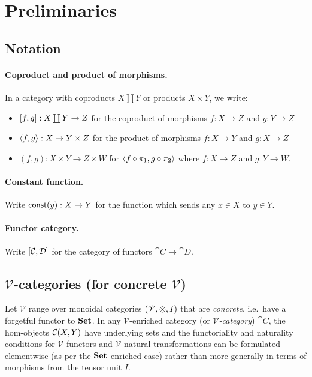 \section{Preliminaries}

\subsection{Notation}

\paragraph{Coproduct and product of morphisms.} In a category with coproducts $X \coprod Y$ or products $X
\times Y$, we write:
\begin{itemize}
\item $[f, g]: X \coprod Y \to Z$ for the coproduct of morphisms $f: X \to Z$ and $g: Y \to Z$
\item $\langle f, g\rangle: X \to Y \times Z$ for the product of morphisms $f: X \to Y$ and $g: X \to Z$
\item $(f,g): X \times Y \to Z \times W$ for $\langle f \circ \pi_1, g \circ \pi_2\rangle$ where $f: X \to Z$ and $g: Y \to W$.
\end{itemize}

\paragraph{Constant function.} Write $\mathsf{const}(y): X \to Y$ for the function which sends any $x \in X$ to $y \in
Y$.

\paragraph{Functor category.} Write $[\mathcal{C},\mathcal{D}]$ for the category of functors $\cat{C} \to
\cat{D}$.

\subsection{$\mathscr{V}$-categories (for concrete $\mathscr{V}$)}

Let $\mathscr{V}$ range over monoidal categories $(\mathscr{V}, \otimes, I)$ that are \emph{concrete},
i.e.~have a forgetful functor to $\mathbf{Set}$. In any $\mathscr{V}$-enriched category (or
\emph{$\mathscr{V}$-category}) $\cat{C}$, the hom-objects ${\mathcal{C}}(X,Y)$ have underlying sets and the
functoriality and naturality conditions for $\mathscr{V}$-functors and $\mathscr{V}$-natural transformations
can be formulated elementwise (as per the $\mathbf{Set}$-enriched case) rather than more generally in terms of
morphisms from the tensor unit $I$. 

